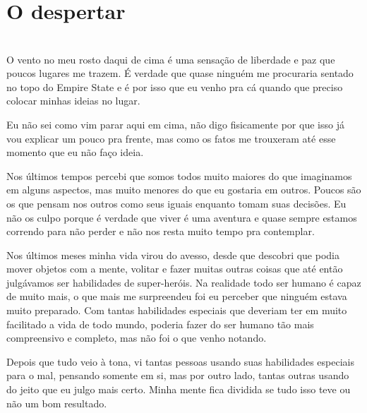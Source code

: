 

\ifdefined\useChapters
\chapter{O despertar}
\else
\chapter{}
\fi




O vento no meu rosto daqui de cima é uma sensação de liberdade e paz que poucos lugares me trazem. É verdade que quase ninguém me procuraria sentado no topo do Empire State e é por isso que eu venho pra cá quando que preciso colocar minhas ideias no lugar.

Eu não sei como vim parar aqui em cima, não digo fisicamente por que isso já vou explicar um pouco pra frente, mas como os fatos me trouxeram até esse momento que eu não faço ideia.

Nos últimos tempos percebi que somos todos muito maiores do que imaginamos em alguns aspectos, mas muito menores do que eu gostaria em outros. Poucos são os que pensam nos outros como seus iguais enquanto tomam suas decisões. Eu não os culpo porque é verdade que viver é uma aventura e quase sempre estamos correndo para não perder e não nos resta muito tempo pra contemplar.

Nos últimos meses minha vida virou do avesso, desde que descobri que podia mover objetos com a mente, volitar e fazer muitas outras coisas que até então julgávamos ser habilidades de super-heróis. Na realidade todo ser humano é capaz de muito mais, o que mais me surpreendeu foi eu perceber que ninguém estava muito preparado. Com tantas habilidades especiais que deveriam ter em muito facilitado a vida de todo mundo, poderia fazer do ser humano tão mais compreensivo e completo, mas não foi o que venho notando.

Depois que tudo veio à tona, vi tantas pessoas usando suas habilidades especiais para o mal, pensando somente em si, mas por outro lado, tantas outras usando do jeito que eu julgo mais certo. Minha mente fica dividida se tudo isso teve ou não um bom resultado.

